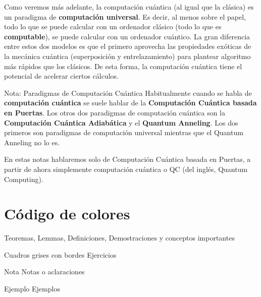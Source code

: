 \documentclass[a4paper,11pt]{book} %
\numberwithin{equation}{chapter}
\begin{document}
Como veremos más adelante, la computación cuántica (al igual que la clásica) es un paradigma de \textbf{computación universal}. Es decir, al menos sobre el papel, todo lo que se puede calcular con un ordenador clásico (todo lo que es \textbf{computable}), se puede calcular con un ordenador cuántico. La gran diferencia entre estos dos modelos es que el primero aprovecha las propiedades exóticas de la mecánica cuántica (superposición y entrelazamiento) para plantear algoritmo más rápidos que los clásicos. De esta forma, la computación cuántica tiene el potencial de acelerar ciertos cálculos. 


	\begin{mybox_blue}{Nota: Paradigmas de Computación Cuántica}
Habitualmente cuando se habla de \textbf{computación cuántica} se suele hablar de la \textbf{Computación Cuántica basada en Puertas}. Los otros dos paradigmas de computación cuántica son la \textbf{Computación Cuántica Adiabática} y el \textbf{Quantum Anneling}. Los dos primeros son paradigmas de computación	universal mientras que el Quantum Anneling no lo es. \vspace{0.3cm}
	
En estas notas hablaremos solo de Computación Cuántica basada en Puertas, a partir de ahora simplemente	computación cuántica o QC (del inglés, Quantum Computing).
	\end{mybox_blue}	




\newpage

\section*{Código de colores}

\begin{mybox_gray2}{}
Teoremas, Lemmas, Definiciones, Demostraciones y conceptos importantes
\end{mybox_gray2}


\begin{mybox_gray}{Cuadros grises con bordes} 
Ejercicios 
\end{mybox_gray} 


\begin{mybox_blue}{Nota}
Notas o aclaraciones
\end{mybox_blue}

\begin{mybox_green}{Ejemplo}
Ejemplos
\end{mybox_green}
\end{document}
